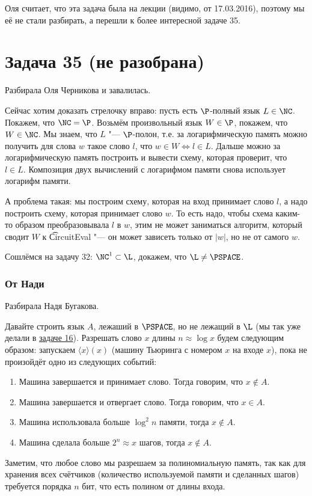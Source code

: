 	Оля считает, что эта задача была на лекции (видимо, от 17.03.2016),
	поэтому мы её не стали разбирать, а перешли к более интересной задаче 35.

	\TODO

\section{Задача 35 (не разобрана)}
	Разбирала Оля Черникова и завалилась.

	Сейчас хотим доказать стрелочку вправо: пусть есть $\P$-полный язык $L \in \NC$.
	Покажем, что $\NC=\P$.
	Возьмём произвольный язык $W \in \P$, покажем, что $W \in \NC$.
	Мы знаем, что $L$ "--- $\P$-полон, т.е. за логарифмическую память можно
	получить для слова $w$ такое слово $l$, что $w \in W \iff l \in L$.
	Дальше можно за логарифмическую память построить и вывести схему, которая проверит, что
	$l \in L$.
	Композиция двух вычислений с логарифмом памяти снова использует логарифм памяти.

	А проблема такая: мы построим схему, которая на вход принимает слово $l$, а надо
	построить схему, которая принимает слово $w$.
	То есть надо, чтобы схема каким-то образом преобразовывала $l$ в $w$, этим не может заниматься
	алгоритм, который сводит $W$ к \t{CircuitEval} "--- он может зависеть только от $|w|$, но не
	от самого $w$.

	Сошлёмся на задачу 32: $\NC^1 \subset \L$, докажем, что $\L \neq \PSPACE$.
	\subsubsection{От Нади}
		Разбирала Надя Бугакова.

		Давайте строить язык $A$, лежаший в $\PSPACE$, но не лежащий в $\L$ (мы так уже делали в \hyperref[prob16]{задаче 16}).
		Разрешать слово $x$ длины $n \approx \log x$ будем следующим образом: запускаем $\langle x \rangle(x)$
		(машину Тьюринга с номером $x$ на входе $x$), пока не произойдёт одно из следующих событий:
		\begin{enumerate}
			\item Машина завершается и принимает слово. Тогда говорим, что $x \notin A$.
			\item Машина завершается и отвергает слово. Тогда говорим, что $x \in A$.
			\item Машина использовала больше $\log^2 n$ памяти, тогда $x \notin A$.
			\item Машина сделала больше $2^n \approx x$ шагов, тогда $x \notin A$.
		\end{enumerate}
		Заметим, что любое слово мы разрешаем за полиномиальную память, так как для хранения
		всех счётчиков (количество используемой памяти и сделанных шагов) требуется порядка
		$n$ бит, что есть полином от длины входа.
		
